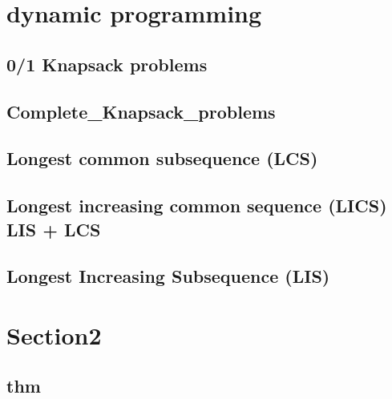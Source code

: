 \section{dynamic programming}
    \subsection{0/1 Knapsack problems}
        

    \subsection{Complete_Knapsack_problems}
        

    \subsection{Longest common subsequence (LCS)}
        

    \subsection{Longest increasing common sequence (LICS) LIS + LCS}
        

    \subsection{Longest Increasing Subsequence (LIS)}
        

\section{Section2}
    \subsection{thm}
        
